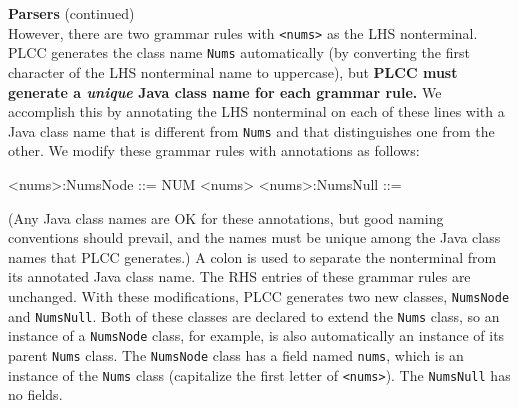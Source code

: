 \begin{minipage}[t]{\sw}
\slidenumber
\LARGE
{\bf Parsers} (continued)\exx
\Large
\emm\LightBox{\MYlon}\vspace{1.5ex}\\
However, there are two grammar rules with \verb'<nums>'
as the LHS nonterminal.
PLCC generates the class name \verb'Nums' automatically
(by converting the first character of the LHS nonterminal name to uppercase),
but {\bf PLCC must generate a
{\em unique} Java class name for each grammar rule.}
We accomplish this by annotating the LHS nonterminal
on each of these lines with a Java class name
that is different from \verb'Nums'
and that distinguishes one from the other.
We modify these grammar rules with annotations as follows:
\begin{qv}
<nums>:NumsNode  ::= NUM <nums>
<nums>:NumsNull  ::=
\end{qv}
(Any Java class names are OK for these annotations,
but good naming conventions should prevail,
and the names must be unique
among the Java class names that PLCC generates.)
A colon is used to separate the nonterminal
from its annotated Java class name.
The RHS entries of these grammar rules are unchanged.\exx
With these modifications, PLCC generates
two new classes, \verb'NumsNode' and \verb'NumsNull'.
Both of these classes are declared to extend the \verb'Nums' class,
so an instance of a \verb'NumsNode' class, for example,
is also automatically an instance of its parent \verb'Nums' class.\exx
The \verb'NumsNode' class has a field named \verb'nums',
which is an instance of the \verb'Nums' class
(capitalize the first letter of \verb'<nums>').
The \verb'NumsNull' has no fields.
\end{minipage}
\clearpage

